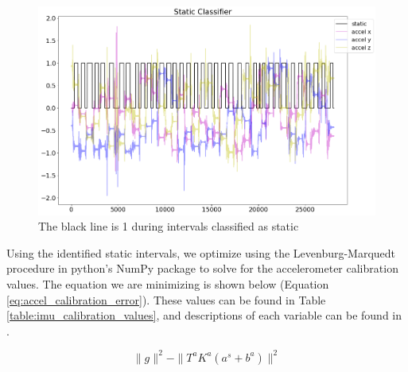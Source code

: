 \documentclass{article}
\begin{document}
    \begin{figure}[H]
      \centering
      \includegraphics[width=1\linewidth]{./images/static_detector.png}
      \caption{The black line is 1 during intervals classified as static}
      \label{fig:static_detector}
    \end{figure}

    Using the identified static intervals, we optimize using the Levenburg-Marquedt procedure in python's NumPy package to solve for the accelerometer calibration values. The equation we are minimizing is shown below (Equation \ref{eq:accel_calibration_error}). These values can be found in Table \ref{table:imu_calibration_values}, and descriptions of each variable can be found in \cite{tedaldi_robust_2014}.

    \begin{equation} \label{eq:accel_calibration_error}
      \rVert g\lVert^2 - \rVert T^aK^a(a^s+b^a)\lVert^2
    \end{equation}

    \begin{table}[H]
      \centering
      \caption{IMU Calibration Values}
      \label{table:imu_calibration_values}
    \end{table}
\end{document}
